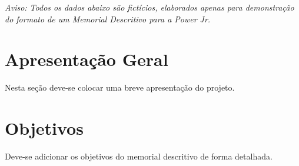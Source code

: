 
%

% 



\textit{Aviso: Todos os dados abaixo são fictícios, elaborados apenas para demonstração do formato de um Memorial Descritivo para a Power Jr.}

\section{Apresentação Geral}

Nesta seção deve-se colocar uma breve apresentação do projeto.
 

\section{Objetivos}

Deve-se adicionar os objetivos do memorial descritivo de forma detalhada.

